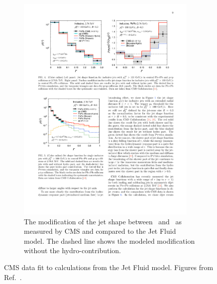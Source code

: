 \begin{figure}
\begin{subfigure}{.45\textwidth}
\includegraphics[width=0.95\textwidth]{figures/jetMeasurements/JF_jetShapeModification}
\caption{The modification of the jet shape between \pp\ and \pbpb\ as measured by CMS \cite{Chatrchyan:2013kwa} and compared to the Jet Fluid model.
The dashed line shows the modeled modification without the hydro-contribution.}
\label{fig:jf_jetshapemod}
\end{subfigure}
\caption{CMS data fit to calculations from the Jet Fluid model.
Figures from Ref.~\cite{Tachibana:2017syd}.}
\label{fig:JF_jetShapemodel}
\end{figure}



